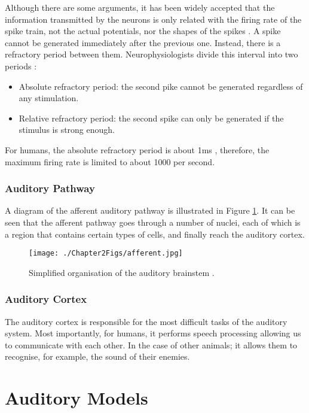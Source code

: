 \documentclass[11pt]{article}
\begin{document}
Although there are some arguments, it has been widely accepted that
the information transmitted by the neurons is only related with the firing
rate of the spike train, not the actual potentials, nor the shapes of
the spikes \cite{Gerstner2002}. A spike cannot be generated
immediately after the previous one. Instead, there is a refractory
period between them. Neurophysiologists divide this interval into two
periods \cite{Gerstner2002}:

\begin{itemize}
\item Absolute refractory period: the second pike cannot be generated
  regardless of any stimulation.
\item Relative refractory period: the second spike can only be
  generated if the stimulus is strong enough.
\end{itemize}

For humans, the absolute refractory period is about 1ms
\cite{Gerstner2002}, therefore, the maximum firing rate is limited to
about 1000 per second.
\subsubsection{Auditory Pathway}
\label{sec-2-4-2}
\label{sec:ch2-auditory-pathway}

A diagram of the afferent auditory pathway is illustrated in
Figure \ref{fig:afferent}. It can be seen that the afferent pathway
goes through a number of nuclei, each of which is a region that contains
certain types of cells, and finally reach the auditory cortex.

\begin{figure}[htb]
\centering
\texttt{[image: ./Chapter2Figs/afferent.jpg]}
\caption{\label{fig:afferent}Simplified organisation of the auditory brainstem \cite{Yost1977}.}
\end{figure}
\subsubsection{Auditory Cortex}
\label{sec-2-4-3}
\label{sec:ch2-auditory-cortex}

The auditory cortex is responsible for the most difficult tasks of the
auditory system. Most importantly, for humans, it performs speech
processing allowing us to communicate with each other. In the case of
other animals; it allows them to recognise, for example, the sound of
their enemies.
\section{Auditory Models}
\label{sec-3}
\label{sec:ch2-auditory-models}
\end{document}
